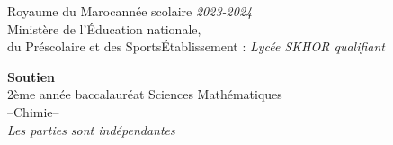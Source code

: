 \documentclass[12pt]{article}
\newcommand\headerMe[2]{\noindent{}#1\hfill#2}
\begin{document}
\headerMe{Royaume du Maroc}{année scolaire \emph{2023-2024}}\\
\headerMe{Ministère de l'Éducation nationale, }{  }\\
\headerMe{du Préscolaire et des Sports}{Établissement : \emph{Lycée SKHOR qualifiant}}\\
\vspace{-1cm}
\begin{center}
  \textbf{Soutien}\\
    2ème année baccalauréat Sciences Mathématiques\\
\hrulefill
  \Large{--Chimie--}
\hrulefill\\

    \emph{Les  parties sont indépendantes}

    \vspace{-.2cm}
\end{center}
\end{document}
